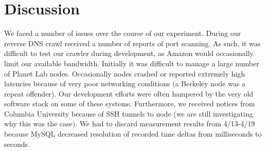 
\section{Discussion}
\label{sec:discussion}
We faced a number of issues over the course of our experiment. During our reverse DNS crawl received a number of reports of port scanning. As such, it was difficult to test our crawler during development, as Amazon would occasionally limit our available bandwidth. Initially it was difficult to manage a large number of Planet Lab nodes. Occasionally nodes crashed or reported extremely high latencies because of very poor networking conditions (a Berkeley node was a repeat offender). Our development efforts were often hampered by the very old software stack on some of these systems. Furthermore, we received notices from Columbia University because of SSH tunnels to node (we are still investigating why this was the case). We had to discard measurement results from 4/13-4/19 because MySQL decreased resolution of recorded time deltas from milliseconds to seconds.

